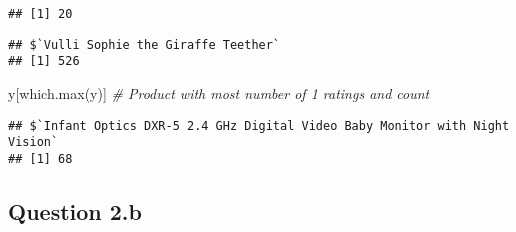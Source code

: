 \documentclass[
]{article}
\newenvironment{Shaded}{\begin{snugshade}}{\end{snugshade}}
\newcommand{\CommentTok}[1]{\textcolor[rgb]{0.56,0.35,0.01}{\textit{#1}}}
\newcommand{\ControlFlowTok}[1]{\textcolor[rgb]{0.13,0.29,0.53}{\textbf{#1}}}
\newcommand{\DecValTok}[1]{\textcolor[rgb]{0.00,0.00,0.81}{#1}}
\newcommand{\FunctionTok}[1]{\textcolor[rgb]{0.00,0.00,0.00}{#1}}
\newcommand{\NormalTok}[1]{#1}
\newcommand{\OtherTok}[1]{\textcolor[rgb]{0.56,0.35,0.01}{#1}}
\newcommand{\SpecialCharTok}[1]{\textcolor[rgb]{0.00,0.00,0.00}{#1}}
\begin{document}
\begin{verbatim}
## [1] 20
\end{verbatim}

\begin{Shaded}
\end{Shaded}

\begin{verbatim}
## $`Vulli Sophie the Giraffe Teether`
## [1] 526
\end{verbatim}

\begin{Shaded}
\begin{Highlighting}[]
\NormalTok{y[}\FunctionTok{which.max}\NormalTok{(y)] }\CommentTok{\# Product with most number of 1 ratings and count}
\end{Highlighting}
\end{Shaded}

\begin{verbatim}
## $`Infant Optics DXR-5 2.4 GHz Digital Video Baby Monitor with Night Vision`
## [1] 68
\end{verbatim}

\hypertarget{question-2.b}{%
\subsection{Question 2.b}\label{question-2.b}}

\begin{Shaded}
\end{Shaded}
\end{document}
